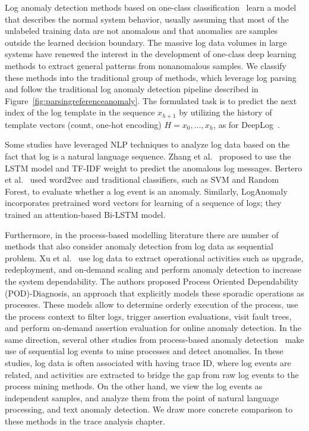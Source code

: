Log anomaly detection methods based on one-class classification~\cite{Zhang2016AutomatedIS,Vinayakumar2017LongSM} learn a model that describes the normal system behavior, usually assuming that most of the unlabeled training data are not anomalous and that anomalies are samples outside the learned decision boundary. The massive log data volumes in large systems have renewed the interest in the development of one-class deep learning methods to extract general patterns from nonanomalous samples. We classify these methods into the traditional group of methods, which leverage log parsing~\cite{nedelkoski2020selfsupervised, he2017drain} and follow the traditional log anomaly detection pipeline described in Figure~\ref{fig:parsingreferenceanomaly}. The formulated task is to predict the next index of the log template in the sequence $x_{h+1}$ by utilizing the history of template vectors (count, one-hot encoding) $H=x_0,\dots,x_h$, as for DeepLog~\cite{du2017deeplog}.

Some studies have leveraged NLP techniques to analyze log data based on the fact that log is a natural language sequence. Zhang et al.~\cite{Zhang2016AutomatedIS} proposed to use the LSTM model and TF-IDF weight to predict the anomalous log messages. Bertero et al.~\cite{bertero2017experience} used word2vec and traditional classifiers, such as SVM and Random Forest, to evaluate whether a log event is an anomaly. Similarly, LogAnomaly~\cite{meng2019loganomaly} incorporates pretrained word vectors for learning of a sequence of logs; they trained an attention-based Bi-LSTM model.

Furthermore, in the process-based modelling literature there are number of methods that also consider anomaly detection from log data as sequential problem. Xu et al.~\cite{xu2014weber} use log data to extract operational activities such as upgrade, redeployment, and on-demand scaling and perform anomaly detection to increase the system dependability. The authors proposed Process Oriented Dependability (POD)-Diagnosis, an approach that explicitly models these
sporadic operations as processes. These models allow to determine orderly execution of the process, use the process context to filter logs, trigger assertion evaluations, visit
fault trees, and perform on-demand assertion evaluation for online anomaly detection. In the same direction, several other studies from process-based anomaly detection~\cite{nolle2020process,PECCHIA2020105054,nolle2016unsupervised,nolle2018analyzing,nolle2019binet,imweber2015,xu2014weber,rehse2020} make use of sequential log events to mine processes and detect anomalies. In these studies, log data is often associated with having trace ID, where log events are related, and activities are extracted to bridge the gap from raw log events to the process mining methods. On the other hand, we view the log events as independent samples, and analyze them from the point of natural language processing, and text anomaly detection. We draw more concrete comparison to these methods in the trace analysis chapter.

